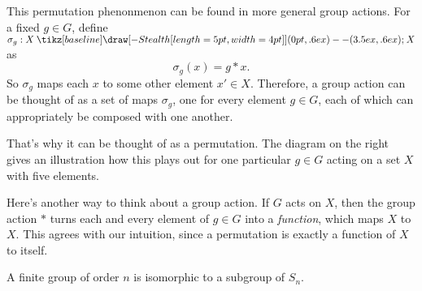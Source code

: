 \documentclass[12pt,letterpaper]{algebra_book}
\renewcommand{\to}{\mathbin{\tikz[baseline] \draw[-{Stealth[length=5pt,width=4pt]}] (0pt,.6ex) -- (3.5ex,.6ex);}}
\theoremstyle{definition}
\begin{document}
    \begin{minipage}{0.7\textwidth}
        \vspace{.3cm}
        This permutation phenonmenon can be found in more general
        group actions.  For a fixed $g \in G$, define $\sigma_g:
        X \to X$ as 
        \[
            \sigma_g(x) = g * x.
        \] 
        So $\sigma_g$ maps each $x$ to some other element $x' \in X$.
        Therefore, a group action can be thought of as a set of maps
        $\sigma_g$, one for every element $g \in G$, each of which can
        appropriately be composed with one another. 
        
        That's why
        it can be thought of as a permutation. The diagram on the right
        gives an illustration how this plays out for one particular
        $g \in G$ acting on a set $X$ with five elements.
    \end{minipage}\hfill
   \begin{minipage}{0.2\textwidth}
        
    \end{minipage} 
    \vspace{.5cm}

    \textcolor{NavyBlue}{Here's another way to think about a group
    action. If $G$ acts on $X$, then the group action $*$ turns each 
    and every element of $g \in G$ into a \textit{function}, which
    maps $X$ to $X$. This agrees with our intuition, since a
    permutation is exactly a function of $X$ to itself. }
    \begin{thm}
        A finite group of order $n$ is isomorphic to a subgroup of $S_n$.
    \end{thm}
    
\end{document}
